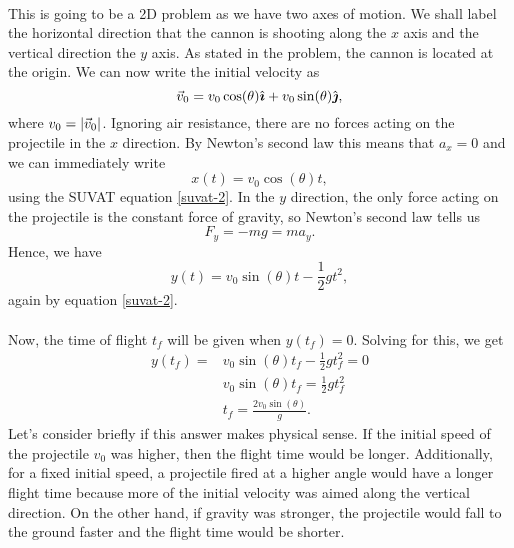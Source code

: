 \documentclass[../newtonian_mechanics.tex]{subfiles}
\begin{document}
        \paragraph{}
        This is going to be a 2D problem as we have two axes of motion.
        We shall label the horizontal direction that the cannon is shooting along the $x$ axis and the vertical direction the $y$ axis.
        As stated in the problem, the cannon is located at the origin.
        We can now write the initial velocity as
        \begin{equation}
            \vec{v}_0 = v_0\cos(\theta)\hat{\boldsymbol{\imath}} + v_0\sin(\theta)\hat{\boldsymbol{\jmath}},
        \end{equation}
        where $v_0=\lvert\vec{v}_0\rvert$.
        Ignoring air resistance, there are no forces acting on the projectile in the $x$ direction.
        By Newton's second law this means that $a_x=0$ and we can immediately write
        \begin{equation}
            x(t) = v_0\cos(\theta)t,
        \end{equation}
        using the SUVAT equation \ref{suvat-2}.
        In the $y$ direction, the only force acting on the projectile is the constant force of gravity, so Newton's second law tells us
        \begin{equation}
            F_y = -mg = ma_y.
        \end{equation}
        Hence, we have
        \begin{equation}
            y(t) = v_0\sin(\theta)t - \frac{1}{2}gt^2,
        \end{equation}
        again by equation \ref{suvat-2}.

        \paragraph{}
        Now, the time of flight $t_f$ will be given when $y(t_f)=0$.
        Solving for this, we get
        \begin{align}
            y(t_f) = &v_0\sin(\theta)t_f - \frac{1}{2}gt_f^2 = 0\\
            &v_0\sin(\theta)t_f = \frac{1}{2}gt_f^2\\
            &t_f = \frac{2v_0\sin(\theta)}{g}.
        \end{align}
        Let's consider briefly if this answer makes physical sense.
        If the initial speed of the projectile $v_0$ was higher, then the flight time would be longer.
        Additionally, for a fixed initial speed, a projectile fired at a higher angle would have a longer flight time because more of the initial velocity was aimed along the vertical direction.
        On the other hand, if gravity was stronger, the projectile would fall to the ground faster and the flight time would be shorter.
\end{document}
